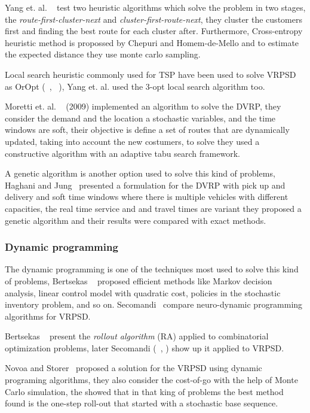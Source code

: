 Yang et. al. ~\cite{yang_stochastic_2000} test two heuristic algorithms which solve the problem in two stages, the \textit{route-first-cluster-next} and \textit{cluster-first-route-next}, they cluster the customers  first and finding the best route for each cluster after. Furthermore, Cross-entropy heuristic method is propossed by Chepuri and Homem-de-Mello \cite{Chepuri} and to estimate the expected distance they use monte carlo sampling.

Local search heuristic commonly used for TSP have been used to solve VRPSD as OrOpt (~\cite{yang_stochastic_2000}, ~\cite{bianchi_hybrid_2006}), Yang et. al. used the 3-opt local search algorithm too.

Moretti et. al. ~\cite{Moretti} (2009) implemented an algorithm to solve the DVRP, they consider the demand and the location a stochastic variables, and the time windows are soft, their objective is define a set of routes that are dynamically updated, taking into account the new costumers, to solve they used a constructive algorithm with an adaptive tabu search framework.

A genetic algorithm is another option used to solve this kind of problems, Haghani and Jung~\cite{haghani_dynamic_2005} presented a formulation for the DVRP with pick up and delivery and soft time windows  where there is multiple vehicles with different capacities, the real time service and and travel times are variant they proposed a genetic algorithm and their results were compared with exact methods.

\subsubsection{Dynamic programming}


The dynamic programming is one of the techniques most used to solve this kind of problems, Bertsekas ~\cite{Bertsekas} proposed efficient methods like Markov decision analysis, linear control model with quadratic cost, policies in the stochastic inventory problem, and so on. Secomandi~\cite{secomandi_comparing_2000} compare neuro-dynamic programming algorithms for VRPSD.

Bertsekas ~\cite{Bertsekas1997} present the \textit{rollout algorithm} (RA) applied to combinatorial optimization problems, later Secomandi (~\cite{Secomandi_1998}, \cite{secomandi_rollout_2001}) show up it applied to VRPSD.

Novoa and Storer~\cite{novoa_approximate_2009} proposed a solution for the VRPSD using dynamic programing algorithms, they also consider the cost-of-go with the help of Monte Carlo simulation, the showed that in that king of problems the best method found is the one-step roll-out that started with a stochastic base sequence.

